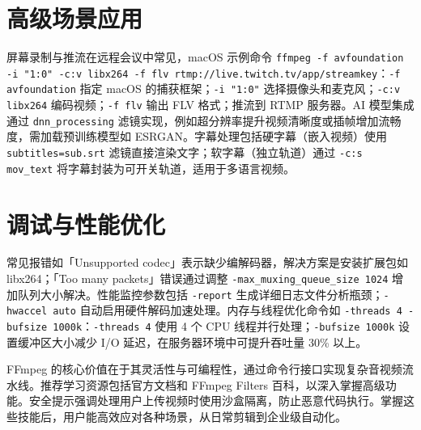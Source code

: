 \chapter{高级场景应用}
屏幕录制与推流在远程会议中常见，macOS 示例命令 \verb!ffmpeg -f avfoundation -i "1:0" -c:v libx264 -f flv rtmp://live.twitch.tv/app/streamkey!：\verb!-f avfoundation! 指定 macOS 的捕获框架；\verb!-i "1:0"! 选择摄像头和麦克风；\verb!-c:v libx264! 编码视频；\verb!-f flv! 输出 FLV 格式；推流到 RTMP 服务器。AI 模型集成通过 \verb!dnn_processing! 滤镜实现，例如超分辨率提升视频清晰度或插帧增加流畅度，需加载预训练模型如 ESRGAN。字幕处理包括硬字幕（嵌入视频）使用 \verb!subtitles=sub.srt! 滤镜直接渲染文字；软字幕（独立轨道）通过 \verb!-c:s mov_text! 将字幕封装为可开关轨道，适用于多语言视频。\par
\chapter{调试与性能优化}
常见报错如「Unsupported codec」表示缺少编解码器，解决方案是安装扩展包如 libx264；「Too many packets」错误通过调整 \verb!-max_muxing_queue_size 1024! 增加队列大小解决。性能监控参数包括 \verb!-report! 生成详细日志文件分析瓶颈；\verb!-hwaccel auto! 自动启用硬件解码加速处理。内存与线程优化命令如 \verb!-threads 4 -bufsize 1000k!：\verb!-threads 4! 使用 4 个 CPU 线程并行处理；\verb!-bufsize 1000k! 设置缓冲区大小减少 I/O 延迟，在服务器环境中可提升吞吐量 30\%{} 以上。\par
FFmpeg 的核心价值在于其灵活性与可编程性，通过命令行接口实现复杂音视频流水线。推荐学习资源包括官方文档和 FFmpeg Filters 百科，以深入掌握高级功能。安全提示强调处理用户上传视频时使用沙盒隔离，防止恶意代码执行。掌握这些技能后，用户能高效应对各种场景，从日常剪辑到企业级自动化。\par
